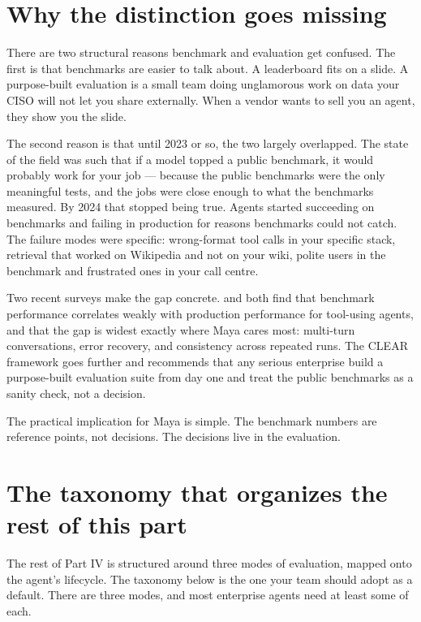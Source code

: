 \section{Why the distinction goes missing}

There are two structural reasons benchmark and evaluation get confused. The first is that benchmarks are easier to talk about. A leaderboard fits on a slide. A purpose-built evaluation is a small team doing unglamorous work on data your CISO will not let you share externally. When a vendor wants to sell you an agent, they show you the slide.

The second reason is that until 2023 or so, the two largely overlapped. The state of the field was such that if a model topped a public benchmark, it would probably work for your job --- because the public benchmarks were the only meaningful tests, and the jobs were close enough to what the benchmarks measured. By 2024 that stopped being true. Agents started succeeding on benchmarks \citep{jimenez2024swebench, mialon2023gaia, yao2024taubench} and failing in production for reasons benchmarks could not catch. The failure modes were specific: wrong-format tool calls in your specific stack, retrieval that worked on Wikipedia and not on your wiki, polite users in the benchmark and frustrated ones in your call centre.

Two recent surveys make the gap concrete. \citet{mohammadi2025survey} and \citet{yehudai2025survey} both find that benchmark performance correlates weakly with production performance for tool-using agents, and that the gap is widest exactly where Maya cares most: multi-turn conversations, error recovery, and consistency across repeated runs. The CLEAR framework \citep{mehta2025clear} goes further and recommends that any serious enterprise build a purpose-built evaluation suite from day one and treat the public benchmarks as a sanity check, not a decision.

The practical implication for Maya is simple. The benchmark numbers are reference points, not decisions. The decisions live in the evaluation.

\section{The taxonomy that organizes the rest of this part}

The rest of Part IV is structured around three modes of evaluation, mapped onto the agent's lifecycle. The taxonomy below is the one your team should adopt as a default. There are three modes, and most enterprise agents need at least some of each.

